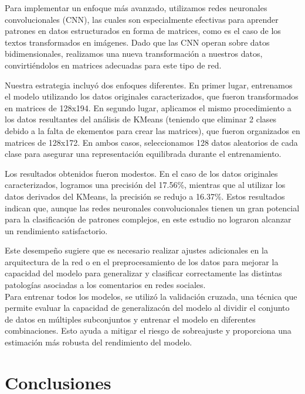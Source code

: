 \documentclass[
10pt, %
a4paper, %
oneside, %
headinclude,footinclude, %
BCOR5mm, %
]{scrartcl}
\begin{document}
Para implementar un enfoque más avanzado, utilizamos redes neuronales convolucionales (CNN), las cuales son especialmente efectivas para aprender patrones en datos estructurados en forma de matrices, 
como es el caso de los textos transformados en imágenes. Dado que las CNN operan sobre datos bidimensionales, realizamos una nueva transformación a nuestros datos, convirtiéndolos en matrices adecuadas 
para este tipo de red.

Nuestra estrategia incluyó dos enfoques diferentes. En primer lugar, entrenamos el modelo utilizando los datos originales caracterizados, que fueron transformados en matrices de 128x194. 
En segundo lugar, aplicamos el mismo procedimiento a los datos resultantes del análisis de KMeans (teniendo que eliminar 2 clases debido a la falta de ekementos para crear las matrices), 
que fueron organizados en matrices de 128x172. En ambos casos, seleccionamos 128 datos aleatorios de cada clase para asegurar una representación equilibrada durante el entrenamiento.

Los resultados obtenidos fueron modestos. En el caso de los datos originales caracterizados, logramos una precisión del 17.56\%, mientras que al utilizar los datos derivados del KMeans, 
la precisión se redujo a 16.37\%. Estos resultados indican que, aunque las redes neuronales convolucionales tienen un gran potencial para la clasificación de patrones complejos, en este estudio 
no lograron alcanzar un rendimiento satisfactorio. 

Este desempeño sugiere que es necesario realizar ajustes adicionales en la arquitectura de la red o en el preprocesamiento de los datos para mejorar la capacidad del modelo para generalizar y clasificar 
correctamente las distintas patologías asociadas a los comentarios en redes sociales.\\



Para entrenar todos los modelos, se utilizó la validación cruzada, una técnica que permite evaluar la capacidad de generalizacón del modelo al dividir el conjunto de datos en múltiples subconjuntos y entrenar el modelo 
en diferentes combinaciones. Esto ayuda a mitigar el riesgo de sobreajuste y proporciona una estimación más robusta del rendimiento del modelo.

\section{Conclusiones}
\end{document}
